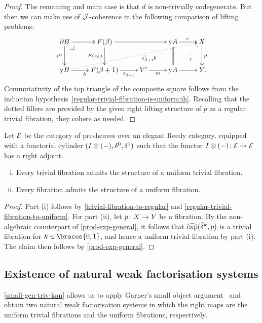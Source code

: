 \documentclass[reqno,10pt,a4paper,oneside,draft]{amsart}
\begin{document}
\begin{proof}
The remaining and main case is that $d$ is non-trivially codegenerate.
But then we can make use of $\cal{J}$-coherence in the following comparison of lifting problems:
\[
\xymatrix{
  \partial B
  \ar[r]
  \ar[d]_{i^B}
  \pullback{dr}
&
  F(\beta)
  \ar[rr]
  \ar[d]_{F(s_{\beta})}
&&
  \yon A
  \ar[r]^{e}
  \ar@{=}[d]
&
  X
  \ar[d]^{p}
\\
  \yon B
  \ar[r]_{b}
  \ar@{.>}[urrrr]_(0.6){e_{\beta+1}' b}
&
  F(\beta+1)
  \ar[r]_-{t_{\beta+1}}
&
  V'
  \ar[r]_-{m}
&
  \yon A
  \ar[r]
  \ar@{.>}[ur]_{e}
&
  Y
\rlap{.}}
\]
Commutativity of the top triangle of the composite square follows from the induction hypothesis~\eqref{regular-trivial-fibration-is-uniform:ih}.
Recalling that the dotted fillers are provided by the given right lifting structure of $p$ as a regular trivial fibration, they cohere as needed.
\end{proof}

\begin{theorem} \label{thm:ac-kan-is-uniform} Let $\catE$ be the category of presheaves over an elegant Reedy category, equipped with a functorial cylinder $(\interval \otimes (-), \lcyl, \rcyl)$ such that the functor $\interval \otimes (-) \co \catE \to \catE$ has a right adjoint.
\begin{enumerate}[(i)]
\item Every trivial fibration admits the structure of a uniform trivial fibration,
\item Every fibration admits the structure of a uniform fibration.
\end{enumerate}
\end{theorem}

\begin{proof}
Part (i) follows by \cref{trivial-fibration-to-regular} and \cref{regular-trivial-fibration-to-uniform}.
For part (ii), let $p \co X \to Y$ be a fibration.
By the non-algebraic counterpart of \cref{prod-exp-general}, it follows that $\hatexp(\bar{\delta}^k, p)$
is a trivial fibration for $k \in \braces{0, 1}$, and hence a uniform trivial fibration by part (i).
The claim then follows by \cref{prod-exp-general}.
\end{proof}

\subsection*{Existence of natural weak factorisation systems}

\cref{small-gen-triv-kan} allows us to apply Garner's small object argument~\cite{garner:small-object-argument} and obtain two natural weak factorisation systems in which the right maps are the uniform trivial fibrations and the uniform fibrations, respectively.
\end{document}
